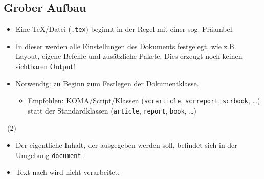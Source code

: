 \subsection{Grober Aufbau}

\begin{frame}[fragile]{\subsecname}
    \begin{itemize}
        \item Eine \TeX\-/Datei (\texttt{.tex}) beginnt in der Regel mit einer sog.
            \alert{Präambel}:
        \item In dieser werden alle Einstellungen des Dokuments festgelegt, wie z.B. Layout, eigene
            Befehle und zusätzliche Pakete. Dies erzeugt noch keinen sichtbaren Output!
        \item Notwendig:  zu Beginn zum Festlegen der
            \alert{Dokumentklasse}.
            \begin{itemize}
                \item Empfohlen: KOMA\-/Script\-/Klassen (\texttt{scrarticle}, \texttt{scrreport},
                    \texttt{scrbook}, \dots) statt der Standardklassen (\texttt{article},
                    \texttt{report}, \texttt{book}, \dots)
            \end{itemize}
    \end{itemize}
\end{frame}

\begin{frame}[fragile]{\subsecname~(2)}
    \begin{itemize}
        \item Der eigentliche Inhalt, der ausgegeben werden soll, befindet sich in der Umgebung
            \texttt{document}:
        \item Text nach \code{} wird nicht verarbeitet.
    \end{itemize}
\end{frame}
